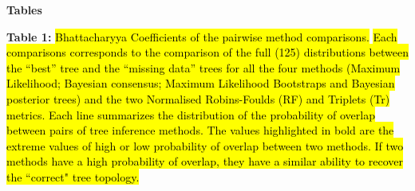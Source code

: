 \documentclass[12pt,letterpaper]{article}
\begin{document}
\newpage
\begin{landscape}

\noindent
\textbf{Tables}\\
\bigskip

\noindent
\textbf{Table 1:} \hl{Bhattacharyya Coefficients of the pairwise method comparisons.}
\hl{Each comparisons corresponds to the comparison of the full (125) distributions between the ``best'' tree and the ``missing data'' trees for all the four methods (Maximum Likelihood; Bayesian consensus; Maximum Likelihood Bootstraps and Bayesian posterior trees) and the two Normalised Robins-Foulds (RF) and Triplets (Tr) metrics. Each line summarizes the distribution of the probability of overlap between pairs of tree inference methods. The values highlighted in bold are the extreme values of high or low probability of overlap between two methods. If two methods have a high probability of overlap, they have a similar ability to recover the ``correct" tree topology.}\\


\end{landscape}
\end{document}
